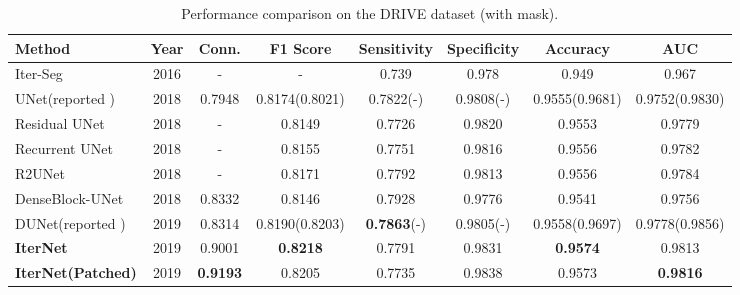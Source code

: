 \documentclass[10pt,twocolumn,letterpaper]{article}
\begin{document}
\begin{table*}[!t]
	\caption{Performance comparison on the DRIVE dataset (with mask).}
	\label{table_detect_performance_drive}
	\centering
	\begin{tabular}{l|c|cccccc}
		\hline
		Method & Year & Conn. & F1 Score & Sensitivity & Specificity & Accuracy & AUC\\ 
		\hline
		Iter-Seg \cite{7042289} &2016&-&- & 0.739 & 0.978 & 0.949& 0.967\\
		UNet(reported \cite{JIN2019}) & 2018& 0.7948 &  0.8174(0.8021)& 0.7822(-)& 0.9808(-) &0.9555(0.9681)  &0.9752(0.9830)\\		
		Residual UNet \cite{alom2018recurrent}&2018&-& 0.8149& 0.7726& 0.9820& 0.9553& 0.9779\\
		Recurrent UNet\cite{alom2018recurrent}& 2018&-& 0.8155& 0.7751& 0.9816 &0.9556& 0.9782\\
		R2UNet \cite{alom2018recurrent}&2018&-& 0.8171 &0.7792& 0.9813& 0.9556 &0.9784\\
		DenseBlock-UNet& 2018& 0.8332 & 0.8146 &0.7928& 0.9776&  0.9541&0.9756\\
		DUNet(reported \cite{JIN2019}) &2019& 0.8314 &0.8190(0.8203)&  \textbf{0.7863}(-) & 0.9805(-) &  0.9558(0.9697)& 0.9778(0.9856)\\
		
		\textbf{IterNet} &2019& 0.9001& \textbf{0.8218} & 0.7791 &0.9831 & \textbf{0.9574}& 0.9813\\
		\textbf{IterNet(Patched)} & 2019& \textbf{0.9193} &0.8205 & 0.7735 & 0.9838 &0.9573& \textbf{0.9816}\\
		
		\hline
	\end{tabular}
\end{table*}
\end{document}
